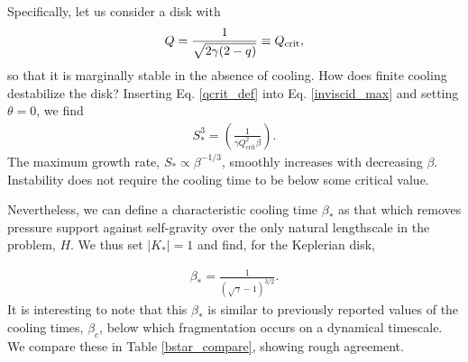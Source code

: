
Specifically, let us consider a disk with 
\begin{align}\label{qcrit_def}
  Q = \frac{1}{\sqrt{2\gamma(2-q)}}\equiv Q_{\mathrm{crit}},
\end{align} 
so that it is marginally stable in the absence of cooling.  
How does finite cooling destabilize the disk?  
Inserting Eq. \ref{qcrit_def} into Eq. \ref{inviscid_max} and setting
$\theta=0$, we find 
\begin{align}\label{sstar}
  S_*^3 = \left(\frac{1}{\gamma Q_\mathrm{crit}^2 \beta}\right). 
\end{align}
The maximum growth rate, $S_*\propto \beta^{-1/3}$, smoothly
increases with decreasing $\beta$. Instability does not require the
cooling time to be below some critical value. 

Nevertheless, we can define a characteristic cooling
time $\beta_*$ as that which removes pressure support against
self-gravity over the only natural lengthscale in the problem, $H$. We
thus set $|K_*|=1$ and find, for the Keplerian disk, 

\begin{align}\label{betastar}
  \beta_* = \frac{1}{\left(\sqrt{\gamma} - 1\right)^{3/2}}. 
\end{align}
It is interesting to note that this $\beta_*$ is similar to previously reported 
values of the cooling times, $\beta_c$, below which fragmentation
occurs on a dynamical timescale. We compare these in Table
\ref{bstar_compare}, showing rough agreement. 


